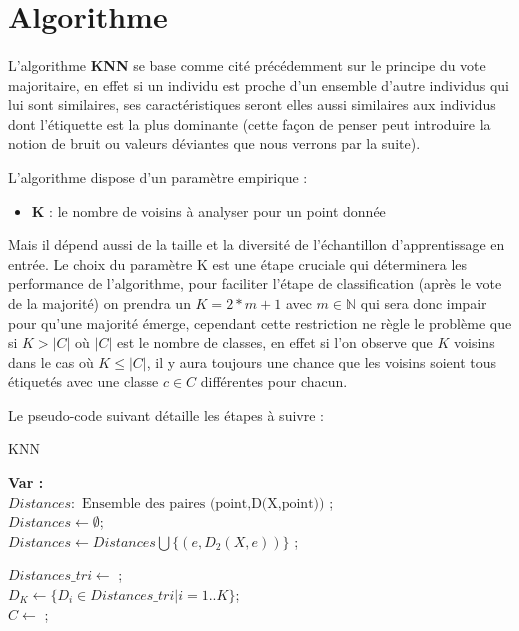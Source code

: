 	\section{Algorithme}
		\paragraph{}
		L'algorithme \textbf{KNN} se base comme cité précédemment sur le principe du vote majoritaire, en effet si un individu est proche d'un ensemble d'autre individus qui lui sont similaires, ses caractéristiques seront elles aussi similaires aux individus dont l'étiquette est la plus dominante (cette façon de penser peut introduire la notion de bruit ou valeurs déviantes que nous verrons par la suite).
		\par L'algorithme dispose d'un paramètre empirique :
		\begin{itemize}
			\item \textbf{K} : le nombre de voisins à analyser pour un point donnée
		\end{itemize}
		Mais il dépend aussi de la taille et la diversité de l'échantillon d'apprentissage en entrée. Le choix du paramètre K est une étape cruciale qui déterminera les performance de l'algorithme, pour faciliter l'étape de classification (après le vote de la majorité) on prendra un $K = 2*m+1$ avec $m \in \mathbb{N}$ qui sera donc impair pour qu'une majorité émerge, cependant cette restriction ne règle le problème que si $K > |C|$ où $|C|$ est le nombre de classes, en effet si l'on observe que $K$ voisins dans le cas où $K \leq |C|$, il y aura toujours une chance que les voisins soient tous étiquetés avec une classe $c \in C$ différentes pour chacun. 
		
		\par 
		Le pseudo-code suivant détaille les étapes à suivre : 
		
		\begin{algorithm}[H]
			\caption{KNN}
			
			\textbf{Var :} \\
			$Distances : \text{ Ensemble des paires (point,D(X,point))}$ ;\\
			$Distances \gets \emptyset $;\\
			{
				$Distances \gets Distances \bigcup \lbrace (e,D_2(X,e)) \rbrace$ ;\\
			}
			
			$Distances\_tri \gets $ ;\\
			$D_K \gets \lbrace D_i \in Distances\_tri | i = 1..K\rbrace$;\\
			$C \gets $ ;\\
		\end{algorithm}
		
